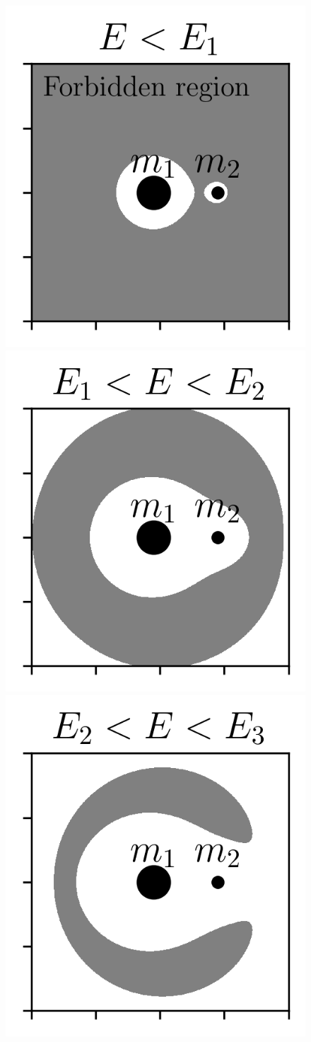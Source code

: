         \begin{figure}
            \centering
            \includegraphics[width=.32\linewidth]{images/CR3BP_forbidden_region_0.png}
            \includegraphics[width=.32\linewidth]{images/CR3BP_forbidden_region_1.png}
            \includegraphics[width=.32\linewidth]{images/CR3BP_forbidden_region_2.png}
            

\end{figure}
